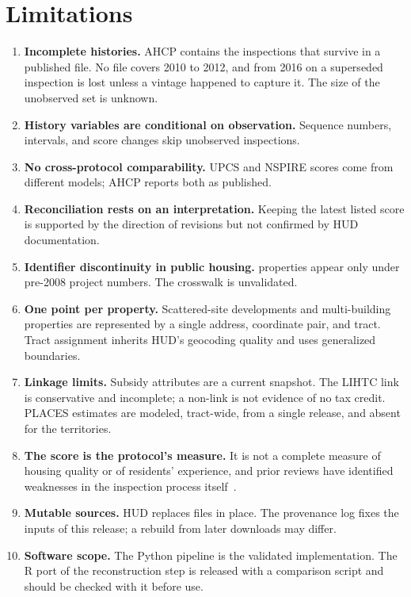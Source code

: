 \documentclass[10pt,twocolumn,letterpaper]{article}
\begin{document}
\section{Limitations}\label{sec:limits}
\begin{enumerate}
\item \textbf{Incomplete histories.} AHCP contains the inspections that survive in a published file. No file covers 2010 to 2012, and from 2016 on a superseded inspection is lost unless a vintage happened to capture it. The size of the unobserved set is unknown.
\item \textbf{History variables are conditional on observation.} Sequence numbers, intervals, and score changes skip unobserved inspections.
\item \textbf{No cross-protocol comparability.} UPCS and NSPIRE scores come from different models; AHCP reports both as published.
\item \textbf{Reconciliation rests on an interpretation.} Keeping the latest listed score is supported by the direction of revisions but not confirmed by HUD documentation.
\item \textbf{Identifier discontinuity in public housing.} \SPropertiesPhPreAmp{} properties appear only under pre-2008 project numbers. The crosswalk is unvalidated.
\item \textbf{One point per property.} Scattered-site developments and multi-building properties are represented by a single address, coordinate pair, and tract. Tract assignment inherits HUD's geocoding quality and uses generalized boundaries.
\item \textbf{Linkage limits.} Subsidy attributes are a current snapshot. The LIHTC link is conservative and incomplete; a non-link is not evidence of no tax credit. PLACES estimates are modeled, tract-wide, from a single release, and absent for the territories.
\item \textbf{The score is the protocol's measure.} It is not a complete measure of housing quality or of residents' experience, and prior reviews have identified weaknesses in the inspection process itself~\cite{gao2019,oig2024}.
\item \textbf{Mutable sources.} HUD replaces files in place. The provenance log fixes the inputs of this release; a rebuild from later downloads may differ.
\item \textbf{Software scope.} The Python pipeline is the validated implementation. The R port of the reconstruction step is released with a comparison script and should be checked with it before use.
\end{enumerate}
\end{document}
